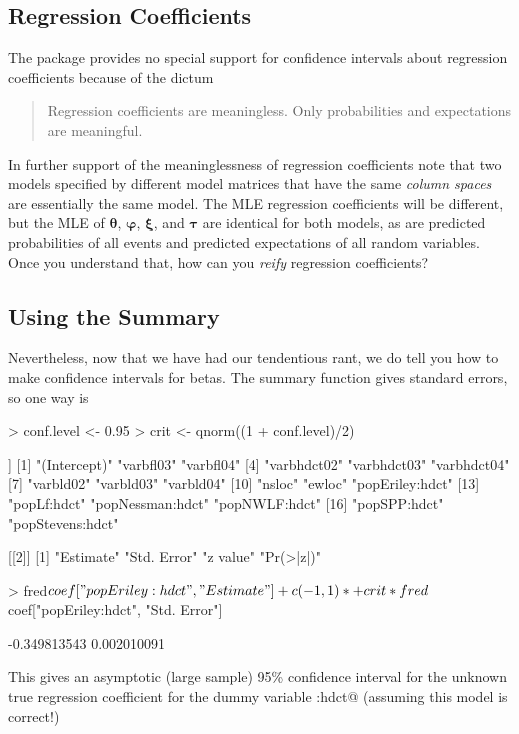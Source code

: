 \documentclass[11pt]{article}
\newcommand{\boldtheta}{{\boldsymbol{\theta}}}
\newcommand{\boldxi}{{\boldsymbol{\xi}}}
\newcommand{\boldtau}{{\boldsymbol{\tau}}}
\newcommand{\boldvarphi}{{\boldsymbol{\varphi}}}
\begin{document}
\subsection{Regression Coefficients}

The package provides no special support for confidence intervals about
regression coefficients because of the dictum
\begin{quote}
Regression coefficients are meaningless.  Only probabilities and expectations
are meaningful.
\end{quote}

In further support of the meaninglessness of regression coefficients note
that two models specified by different model matrices that have the
same \emph{column spaces} are essentially the same model.  The MLE regression
coefficients will be different, but the MLE
of $\boldtheta$, $\boldvarphi$, $\boldxi$, and $\boldtau$ are identical
for both models,
as are predicted probabilities of all events and predicted expectations
of all random variables.  Once you understand that, how can you \emph{reify}
regression coefficients?

\subsection{Using the Summary}

Nevertheless, now that we have had our tendentious rant, we do tell you
how to make confidence intervals for betas.  The summary function gives
standard errors, so one way is
\begin{Schunk}
\begin{Sinput}
> conf.level <- 0.95
> crit <- qnorm((1 + conf.level)/2)
\end{Sinput}
\end{Schunk}
\begin{Schunk}
\begin{Soutput}
[[1]]
 [1] "(Intercept)"     "varbfl03"        "varbfl04"       
 [4] "varbhdct02"      "varbhdct03"      "varbhdct04"     
 [7] "varbld02"        "varbld03"        "varbld04"       
[10] "nsloc"           "ewloc"           "popEriley:hdct" 
[13] "popLf:hdct"      "popNessman:hdct" "popNWLF:hdct"   
[16] "popSPP:hdct"     "popStevens:hdct"

[[2]]
[1] "Estimate"   "Std. Error" "z value"    "Pr(>|z|)"  
\end{Soutput}
\begin{Sinput}
> fred$coef["popEriley:hdct", "Estimate"] + c(-1, 1) * 
+     crit * fred$coef["popEriley:hdct", "Std. Error"]
\end{Sinput}
\begin{Soutput}
[1] -0.349813543  0.002010091
\end{Soutput}
\end{Schunk}
This gives an asymptotic (large sample) 95\% confidence
interval for the unknown true regression coefficient for the dummy variable
\verb@popEriley:hdct@ (assuming this model is correct!)
\end{document}
